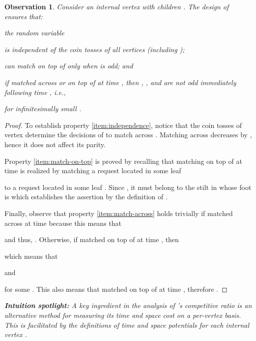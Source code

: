 \documentclass[11pt]{article}
\def\LongVersion{}
\def\LongVersionEnd{}
\theoremstyle{definition}
\theoremstyle{plain}
\newtheorem*{observation*}{Observation}
\theoremstyle{definition}
\theoremstyle{plain}
\theoremstyle{definition}
\theoremstyle{plain}
\newenvironment{DenseEnumerate}[1][\theenumi.]
{\begin{list}{#1}{\usecounter{enumi}
\itemsep 0pt \parsep 0pt \leftmargin 5mm \labelwidth 5mm \parskip 0pt \topsep
0pt}}
{\end{list}}
\newenvironment{IntuitionSpotlight}[0]
{\par \setlength{\leftskip}{0.5\parindent}\setlength{\rightskip}{0.5\parindent}\noindent\itshape\textbf{Intuition spotlight:}}
{\par\ignorespacesafterend}
\begin{document}
\begin{observation*}
Consider an internal vertex  with children .
The design of  ensures that:
\begin{DenseEnumerate}

\item \label{item:independence}
the random variable

is independent of the coin tosses of all vertices  (including
);

\item \label{item:match-on-top}
 can match on top of  only when  is odd; and

\item \label{item:match-across}
if  matched across or on top of  at time , then
\LongVersion , , and  are not odd immediately following time
, i.e.,
\LongVersionEnd 
for infinitesimally small
.

\end{DenseEnumerate}
\end{observation*}
\begin{proof}
To establish property \ref{item:independence}, notice that the coin tosses of
vertex  determine the decisions of  to match across .
Matching across  decreases  by , hence it does not
affect its parity.
\LongVersion \par \LongVersionEnd
Property \ref{item:match-on-top} is proved by recalling that matching on top
of  at time  is realized by matching a request located in some leaf

to a request located in some leaf
.
Since , it must belong to the stilt in 
whose foot is  which establishes the assertion by the definition of
.
\LongVersion \par \LongVersionEnd
Finally, observe that property \ref{item:match-across} holds trivially if 
matched across  at time  because this means that

and thus,
.
Otherwise, if  matched on top of  at time , then

which means that

and

for some
.
This also means that  matched on top of  at time , therefore
.
\end{proof}

\begin{IntuitionSpotlight}
A key ingredient in the analysis of 's competitive ratio is an alternative
method for measuring its time and space cost on a \emph{per-vertex basis}.
This is facilitated by the definitions of time and space potentials for each
internal vertex .
\end{IntuitionSpotlight}
\end{document}
